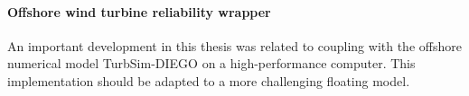 \paragraph{Offshore wind turbine reliability wrapper}
An important development in this thesis was related to coupling \ots with the offshore numerical model TurbSim-DIEGO on a high-performance computer. 
This implementation should be adapted to a more challenging floating model.